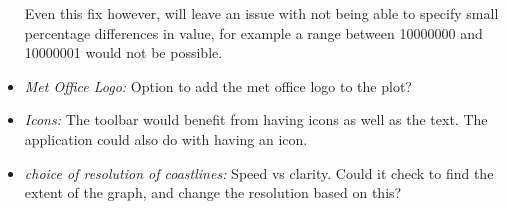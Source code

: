 \documentclass[whitecover]{MO_report}
\begin{document}
\begin{itemize}
Even this fix however, will leave an issue with not being able to specify small
percentage differences in value, for example a range between 10000000 and
10000001 would not be possible. 

\item
\emph{Met Office Logo: } Option to add the met office logo to the plot?

\item
\emph{Icons:} The toolbar would benefit from having icons as well as the text.
The application could also do with having an icon.

\item
\emph{choice of resolution of coastlines: } Speed vs clarity. Could it check to
find the extent of the graph, and change the resolution based on this?

\end{itemize}
\end{document}
